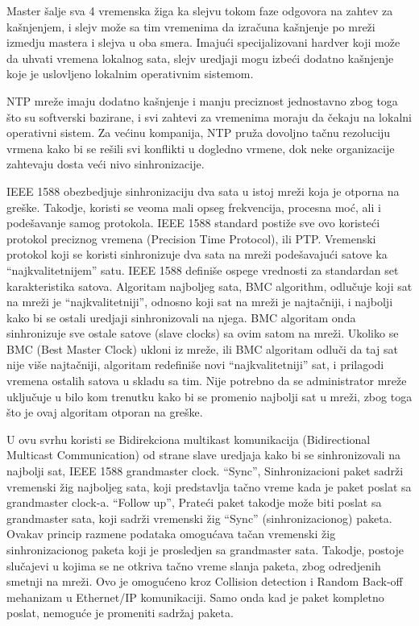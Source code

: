 \documentclass[a4paper,12pt, master]{etf}
\begin{document}
	Master \v{s}alje sva 4 vremenska \v{z}iga ka slejvu tokom faze odgovora na zahtev za ka\v{s}njenjem,
	i slejv mo\v{z}e sa tim vremenima da izra\v{c}una ka\v{s}njenje po mre\v{z}i izmedju mastera i slejva u
	oba smera. Imaju\'{c}i specijalizovani hardver koji mo\v{z}e da uhvati vremena lokalnog sata,
	slejv uredjaji mogu izbe\'{c}i dodatno ka\v{s}njenje koje je uslovljeno lokalnim operativnim
	sistemom.

	NTP mre\v{z}e imaju dodatno ka\v{s}njenje i manju preciznost jednostavno zbog toga \v{s}to su
	softverski bazirane, i svi zahtevi za vremenima moraju da \v{c}ekaju na lokalni operativni
	sistem. Za ve\'{c}inu kompanija, NTP pru\v{z}a dovoljno ta\v{c}nu rezoluciju vrmena kako bi se re\v{s}ili
	svi konflikti u dogledno vrmene, dok neke organizacije zahtevaju dosta ve\'{c}i nivo
	sinhronizacije.

	IEEE 1588 obezbedjuje sinhronizaciju dva sata u istoj mre\v{z}i koja je otporna na gre\v{s}ke.
	Takodje, koristi se veoma mali opseg frekvencija, procesna mo\'{c}, ali i pode\v{s}avanje samog
	protokola. IEEE 1588 standard posti\v{z}e sve ovo koriste\'{c}i protokol preciznog vremena
	(Precision Time Protocol), ili PTP\@. Vremenski protokol koji se koristi sinhronizuje dva sata na
	mre\v{z}i pode\v{s}avaju\'{c}i satove ka ``najkvalitetnijem'' satu. IEEE 1588
	defini\v{s}e ospege vrednosti za standardan set karakteristika satova. Algoritam najboljeg
	sata, BMC algorithm, odlu\v{c}uje koji sat na mre\v{z}i je ``najkvalitetniji'', odnosno koji sat na
	mre\v{z}i je najta\v{c}niji, i najbolji kako bi se ostali uredjaji sinhronizovali na njega. BMC
	algoritam onda sinhronizuje sve ostale satove (slave clocks) sa ovim satom na mre\v{z}i.
	Ukoliko se BMC (Best Master Clock) ukloni iz mre\v{z}e, ili BMC algoritam odlu\v{c}i da taj sat
	nije vi\v{s}e najta\v{c}niji, algoritam redefini\v{s}e novi ``najkvalitetniji'' sat, i prilagodi
	vremena ostalih satova u skladu sa tim. Nije potrebno da se administrator mre\v{z}e uklju\v{c}uje
	u bilo kom trenutku kako bi se promenio najbolji sat u mre\v{z}i, zbog toga \v{s}to je ovaj
	algoritam otporan na gre\v{s}ke.

	U ovu svrhu koristi se Bidirekciona multikast komunikacija (Bidirectional Multicast Communication)
	 od strane slave uredjaja kako bi se sinhronizovali na najbolji sat, IEEE 1588 grandmaster clock.
	``Sync'', Sinhronizacioni paket sadr\v{z}i vremenski \v{z}ig najboljeg sata, koji predstavlja
	ta\v{c}no vreme kada je paket poslat sa grandmaster clock-a. ``Follow up'', Prate\'{c}i paket
	takodje mo\v{z}e biti poslat sa grandmaster sata, koji sadr\v{z}i vremenski \v{z}ig ``Sync''
	(sinhronizacionog) paketa. Ovakav princip razmene podataka omogu\'{c}ava ta\v{c}an vremenski
	\v{z}ig sinhronizacionog paketa koji je prosledjen sa grandmaster sata. Takodje, postoje
	slu\v{c}ajevi u kojima se ne otkriva ta\v{c}no vreme slanja paketa, zbog odredjenih smetnji na
	mre\v{z}i. Ovo je omogu\'{c}eno kroz Collision detection i Random Back-off
	mehanizam u Ethernet/IP komunikaciji. Samo onda kad je paket kompletno poslat, nemogu\'{c}e
	je promeniti sadr\v{z}aj paketa.
\end{document}

